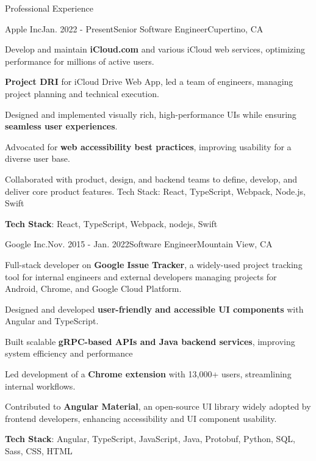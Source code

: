 \documentclass{resume} %
\begin{document}
\begin{rSection}{Professional Experience}

\begin{rSubsection}{Apple Inc}{Jan. 2022 - Present}{Senior Software Engineer}{Cupertino, CA}
\item Develop and maintain \textbf{iCloud.com} and various iCloud web services, optimizing performance for millions of active users.
\item \textbf{Project DRI} for iCloud Drive Web App, led a team of engineers, managing project planning and technical execution.
\item Designed and implemented visually rich, high-performance UIs while ensuring \textbf{seamless user experiences}.
\item Advocated for \textbf{web accessibility best practices}, improving usability for a diverse user base.
\item Collaborated with product, design, and backend teams to define, develop, and deliver core product features.
Tech Stack: React, TypeScript, Webpack, Node.js, Swift
\item \textbf{Tech Stack}: React, TypeScript, Webpack, nodejs, Swift
\end{rSubsection}


\begin{rSubsection}{Google Inc.}{Nov. 2015 - Jan. 2022}{Software Engineer}{Mountain View, CA}
\item Full-stack developer on \textbf{Google Issue Tracker}, a widely-used project tracking tool for internal engineers and external developers managing projects for Android, Chrome, and Google Cloud Platform.
\item Designed and developed \textbf{user-friendly and accessible UI components} with Angular and TypeScript.
\item Built scalable \textbf{gRPC-based APIs and Java backend services}, improving system efficiency and performance
\item Led development of a \textbf{Chrome extension} with 13,000+ users, streamlining internal workflows.
\item Contributed to \textbf{Angular Material}, an open-source UI library widely adopted by frontend developers, enhancing accessibility and UI component usability.
\item \textbf{Tech Stack}: Angular, TypeScript, JavaScript, Java, Protobuf, Python, SQL, Sass, CSS, HTML

\end{rSubsection}


\end{rSection}
\end{document}
